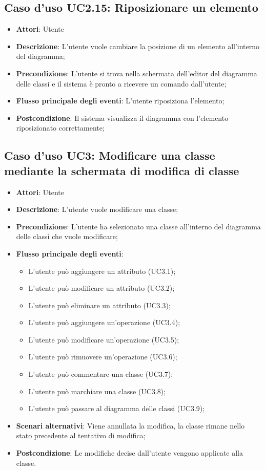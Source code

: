 \documentclass[../AnalisiDeiRequisiti.tex]{subfiles}
\begin{document}
		\subsection{Caso d'uso UC2.15: Riposizionare un elemento}
		\begin{itemize}
			\item \textbf{Attori}: Utente
			\item \textbf{Descrizione}: L'utente vuole cambiare la posizione di un elemento all'interno del diagramma;
			\item \textbf{Precondizione}: L'utente si trova nella schermata dell'editor del diagramma delle classi e il sistema è pronto a ricevere un comando dall'utente;
			\item \textbf{Flusso principale degli eventi}: L'utente riposiziona l'elemento;
			\item \textbf{Postcondizione}: Il sistema visualizza il diagramma con l'elemento riposizionato correttamente;
		\end{itemize}
		\subsection{Caso d'uso UC3: Modificare una classe mediante la schermata di modifica di classe}
		\begin{itemize}
			\item \textbf{Attori}: Utente
			\item \textbf{Descrizione}: L'utente vuole modificare una classe;
			\item \textbf{Precondizione}: L'utente ha selezionato una classe all'interno del diagramma delle classi che vuole modificare;
			\item \textbf{Flusso principale degli eventi}: \begin{itemize}
				\item L'utente può aggiungere un attributo (UC3.1);
				\item L'utente può modificare un attributo (UC3.2);
				\item L'utente può eliminare un attributo (UC3.3);
				\item L'utente può aggiungere un'operazione (UC3.4);
				\item L'utente può modificare un'operazione (UC3.5);
				\item L'utente può rimuovere un'operazione (UC3.6);
				\item L'utente può commentare una classe (UC3.7);
				\item L'utente può marchiare una classe (UC3.8);
				\item L'utente può passare al diagramma delle classi (UC3.9);
			\end{itemize}
			\item \textbf{Scenari alternativi}: Viene annullata la modifica, la classe rimane nello stato precedente al tentativo di modifica;
			\item \textbf{Postcondizione}: Le modifiche decise dall'utente vengono applicate alla classe.
		\end{itemize}
\end{document}
